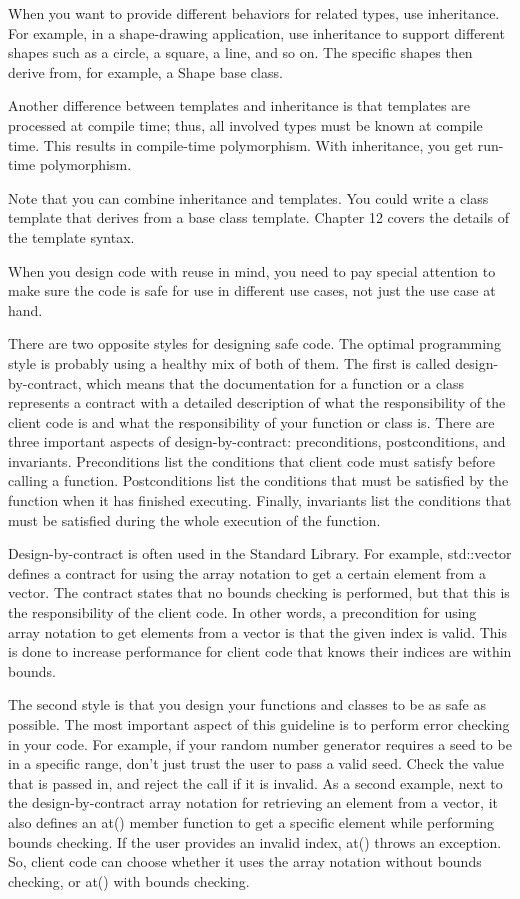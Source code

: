 When you want to provide different behaviors for related types, use inheritance. For example, in a shape-drawing application, use inheritance to support different shapes such as a circle, a square, a line, and so on. The specific shapes then derive from, for example, a Shape base class.

Another difference between templates and inheritance is that templates are processed at compile time; thus, all involved types must be known at compile time. This results in compile-time polymorphism. With inheritance, you get run-time polymorphism.

Note that you can combine inheritance and templates. You could write a class template that derives from a base class template. Chapter 12 covers the details of the template syntax.


When you design code with reuse in mind, you need to pay special attention to make sure the code is safe for use in different use cases, not just the use case at hand.

There are two opposite styles for designing safe code. The optimal programming style is probably using a healthy mix of both of them. The first is called design-by-contract, which means that the documentation for a function or a class represents a contract with a detailed description of what the responsibility of the client code is and what the responsibility of your function or class is. There are three important aspects of design-by-contract: preconditions, postconditions, and invariants. Preconditions list the conditions that client code must satisfy before calling a function. Postconditions list the conditions that must be satisfied by the function when it has finished executing. Finally, invariants list the conditions that must be satisfied during the whole execution of the function.

Design-by-contract is often used in the Standard Library. For example, std::vector defines a contract for using the array notation to get a certain element from a vector. The contract states that no bounds checking is performed, but that this is the responsibility of the client code. In other words, a precondition for using array notation to get elements from a vector is that the given index is valid.
This is done to increase performance for client code that knows their indices are within bounds.

The second style is that you design your functions and classes to be as safe as possible. The most important aspect of this guideline is to perform error checking in your code. For example, if your random number generator requires a seed to be in a specific range, don’t just trust the user to pass a valid seed. Check the value that is passed in, and reject the call if it is invalid. As a second example, next to the design-by-contract array notation for retrieving an element from a vector, it also defines an at() member function to get a specific element while performing bounds checking. If the user provides an invalid index, at() throws an exception. So, client code can choose whether it uses the array notation without bounds checking, or at() with bounds checking.

